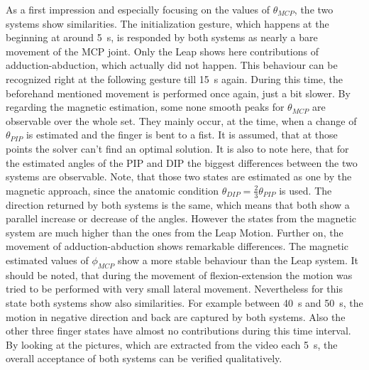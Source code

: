 As a first impression and especially focusing on the values of $ \theta_{MCP} $, the two systems show similarities. The initialization gesture, which happens at the beginning at around \SI{5}{\second}, is responded by both systems as nearly a bare movement of the \ac{MCP} joint. Only the Leap shows here contributions of adduction-abduction, which actually did not happen. This behaviour can be recognized right at the following gesture till \SI{15}{\second} again. During this time, the beforehand mentioned movement is performed once again, just a bit slower. By regarding the magnetic estimation, some none smooth peaks for $ \theta_{MCP} $ are observable over the whole set. They mainly occur, at the time, when a change of $ \theta_{PIP} $ is estimated and the finger is bent to a fist. It is assumed, that at those points the solver can't find an optimal solution. It is also to note here, that for the estimated angles of the \ac{PIP} and \ac{DIP} the biggest differences between the two systems are observable. Note, that those two states are estimated as one by the magnetic approach, since the anatomic condition $ \theta_{DIP} = \frac{2}{3} \theta_{PIP} $ is used. The direction returned by both systems is the same, which means that both show a parallel increase or decrease of the angles. However the states from the magnetic system are much higher than the ones from the Leap Motion. Further on, the movement of adduction-abduction shows remarkable differences. The magnetic estimated values of $ \phi_{MCP} $ show a more stable behaviour than the Leap system. It should be noted, that during the movement of flexion-extension the motion was tried to be performed with very small lateral movement. Nevertheless for this state both systems show also similarities. For example between \SI{40}{\second} and \SI{50}{\second}, the motion in negative direction and back are captured by both systems. Also the other three finger states have almost no contributions during this time interval. By looking at the pictures, which are extracted from the video each \SI{5}{\second}, the overall acceptance of both systems can be verified qualitatively.
